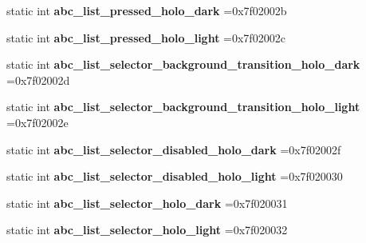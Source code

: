 \begin{DoxyCompactItemize}
static int {\bfseries abc\+\_\+list\+\_\+pressed\+\_\+holo\+\_\+dark} =0x7f02002b
\item 
\mbox{\label{classandroid_1_1support_1_1v7_1_1appcompat_1_1R_1_1drawable_ae1d0fab1721c7584c37276ffd0c16318}} 
static int {\bfseries abc\+\_\+list\+\_\+pressed\+\_\+holo\+\_\+light} =0x7f02002c
\item 
\mbox{\label{classandroid_1_1support_1_1v7_1_1appcompat_1_1R_1_1drawable_a1992abb06db3a05271dd9b660d6fcd0c}} 
static int {\bfseries abc\+\_\+list\+\_\+selector\+\_\+background\+\_\+transition\+\_\+holo\+\_\+dark} =0x7f02002d
\item 
\mbox{\label{classandroid_1_1support_1_1v7_1_1appcompat_1_1R_1_1drawable_aa2f4fdc97c72e00bcdb000c61b3e2e18}} 
static int {\bfseries abc\+\_\+list\+\_\+selector\+\_\+background\+\_\+transition\+\_\+holo\+\_\+light} =0x7f02002e
\item 
\mbox{\label{classandroid_1_1support_1_1v7_1_1appcompat_1_1R_1_1drawable_ab7d97f388673b4a14d65947347a3aa7f}} 
static int {\bfseries abc\+\_\+list\+\_\+selector\+\_\+disabled\+\_\+holo\+\_\+dark} =0x7f02002f
\item 
\mbox{\label{classandroid_1_1support_1_1v7_1_1appcompat_1_1R_1_1drawable_a55077a59c16c1f69ea5da8e8dd418fc0}} 
static int {\bfseries abc\+\_\+list\+\_\+selector\+\_\+disabled\+\_\+holo\+\_\+light} =0x7f020030
\item 
\mbox{\label{classandroid_1_1support_1_1v7_1_1appcompat_1_1R_1_1drawable_af9dbbde49693cb876145f3525da7cacc}} 
static int {\bfseries abc\+\_\+list\+\_\+selector\+\_\+holo\+\_\+dark} =0x7f020031
\item 
\mbox{\label{classandroid_1_1support_1_1v7_1_1appcompat_1_1R_1_1drawable_a8a1b5eb246200328db0dc0d8ac752788}} 
static int {\bfseries abc\+\_\+list\+\_\+selector\+\_\+holo\+\_\+light} =0x7f020032

\end{DoxyCompactItemize}
